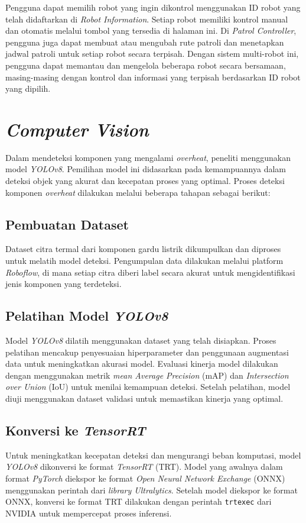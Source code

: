 Pengguna dapat memilih robot yang ingin dikontrol menggunakan ID robot yang telah didaftarkan di \emph{Robot Information}. Setiap robot memiliki kontrol manual dan otomatis melalui tombol yang tersedia di halaman ini. Di \emph{Patrol Controller}, pengguna juga dapat membuat atau mengubah rute patroli dan menetapkan jadwal patroli untuk setiap robot secara terpisah. Dengan sistem multi-robot ini, pengguna dapat memantau dan mengelola beberapa robot secara bersamaan, masing-masing dengan kontrol dan informasi yang terpisah berdasarkan ID robot yang dipilih.

\section{\emph{Computer Vision}}

Dalam mendeteksi komponen yang mengalami \emph{overheat}, peneliti menggunakan model \emph{YOLOv8}. Pemilihan model ini didasarkan pada kemampuannya dalam deteksi objek yang akurat dan kecepatan proses yang optimal. Proses deteksi komponen \emph{overheat} dilakukan melalui beberapa tahapan sebagai berikut:

\subsection{Pembuatan Dataset}
Dataset citra termal dari komponen gardu listrik dikumpulkan dan diproses untuk melatih model deteksi. Pengumpulan data dilakukan melalui platform \emph{Roboflow}, di mana setiap citra diberi label secara akurat untuk mengidentifikasi jenis komponen yang terdeteksi.

\subsection{Pelatihan Model \emph{YOLOv8}}
Model \emph{YOLOv8} dilatih menggunakan dataset yang telah disiapkan. Proses pelatihan mencakup penyesuaian hiperparameter dan penggunaan augmentasi data untuk meningkatkan akurasi model. Evaluasi kinerja model dilakukan dengan menggunakan metrik \emph{mean Average Precision} (mAP) dan \emph{Intersection over Union} (IoU) untuk menilai kemampuan deteksi. Setelah pelatihan, model diuji menggunakan dataset validasi untuk memastikan kinerja yang optimal.

\subsection{Konversi ke \emph{TensorRT}}
Untuk meningkatkan kecepatan deteksi dan mengurangi beban komputasi, model \emph{YOLOv8} dikonversi ke format \emph{TensorRT} (TRT). Model yang awalnya dalam format \emph{PyTorch} diekspor ke format \emph{Open Neural Network Exchange} (ONNX) menggunakan perintah dari \emph{library Ultralytics}. Setelah model diekspor ke format ONNX, konversi ke format TRT dilakukan dengan perintah \texttt{trtexec} dari NVIDIA untuk mempercepat proses inferensi.

